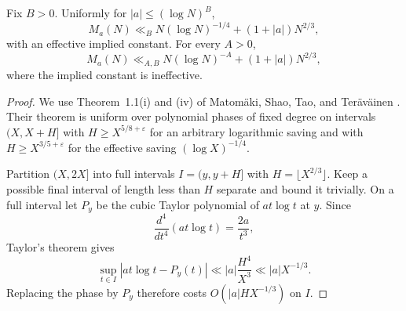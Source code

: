 \documentclass[11pt]{amsart}
\numberwithin{equation}{section}\setcounter{tocdepth}{3}\setcounter{secnumdepth}{3}
\begin{document}
\begin{proposition}
\label{prop:arithmetic_mobius_nlogn}
Fix $B>0$.  Uniformly for $|a|\le(\log N)^B$,
\begin{equation}
 M_a(N)\ll_B N(\log N)^{-1/4}+(1+|a|)N^{2/3},
 \label{eq:arithmetic_effective_mobius_nlogn}
\end{equation}
with an effective implied constant.  For every $A>0$,
\begin{equation}
 M_a(N)\ll_{A,B} N(\log N)^{-A}+(1+|a|)N^{2/3},
 \label{eq:arithmetic_strong_mobius_nlogn}
\end{equation}
where the implied constant is ineffective.
\end{proposition}
\begin{proof}
We use Theorem~1.1(i) and (iv) of
Matom\"aki, Shao, Tao, and Ter\"av\"ainen
\cite{MatomakiShaoTaoTeravainen2023}.  Their theorem is uniform over polynomial
phases of fixed degree on intervals $(X,X+H]$ with
$H\ge X^{5/8+\varepsilon}$ for an arbitrary logarithmic saving and with
$H\ge X^{3/5+\varepsilon}$ for the effective saving $(\log X)^{-1/4}$.

Partition $(X,2X]$ into full intervals $I=(y,y+H]$ with
$H=\lfloor X^{2/3}\rfloor$.  Keep a possible final interval of length less than $H$
separate and bound it trivially.  On a full interval let $P_y$ be the cubic Taylor
polynomial of $a t\log t$ at $y$.  Since
\begin{equation}
 \frac{d^4}{dt^4}(a t\log t)=\frac{2a}{t^3},
 \label{eq:arithmetic_fourth_derivative_nlogn}
\end{equation}
Taylor's theorem gives
\begin{equation}
 \sup_{t\in I}|a t\log t-P_y(t)|
 \ll |a|\frac{H^4}{X^3}\ll |a|X^{-1/3}.
 \label{eq:arithmetic_taylor_remainder}
\end{equation}
Replacing the phase by $P_y$ therefore costs $O(|a|HX^{-1/3})$ on $I$.


\end{proof}
\end{document}
